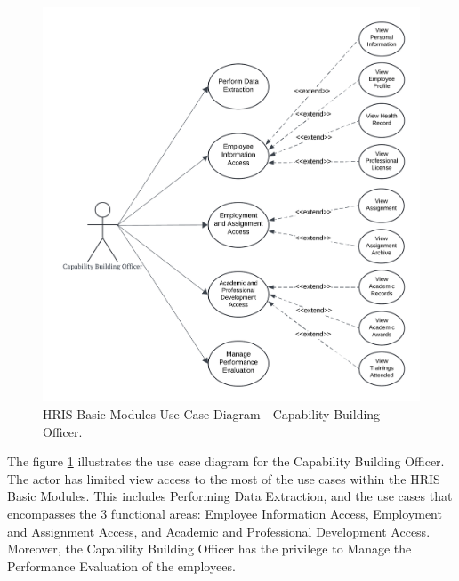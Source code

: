     \begin{figure}[H]
        \centering
        \includegraphics[width=0.9\linewidth]{figures/images/diagrams/usecase/use-case-basic-7.png}
        \caption{HRIS Basic Modules Use Case Diagram - Capability Building Officer.}
        \label{fig:use-case-basic-7}
    \end{figure}

    The figure \ref{fig:use-case-basic-7} illustrates the use case diagram for the Capability Building Officer. The actor has limited view access to the most of the use cases within the HRIS Basic Modules. This includes Performing Data Extraction, and the use cases that  encompasses the 3 functional areas: Employee Information Access, Employment and Assignment Access, and Academic and Professional Development Access. Moreover, the Capability Building Officer has the privilege to Manage the Performance Evaluation of the employees.

